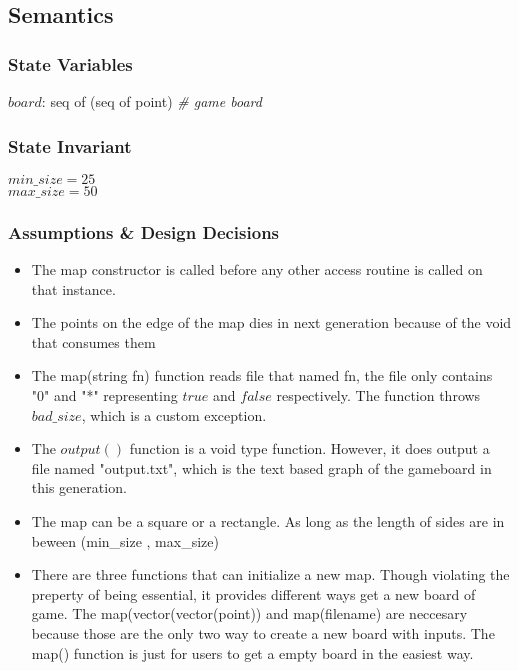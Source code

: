 \documentclass[12pt]{article}
\begin{document}
\subsection* {Semantics}

\subsubsection* {State Variables}

$board$: seq of (seq of point) \textit{\# game board}\\

\subsubsection* {State Invariant}

$min\_size = 25$\\
$max\_size = 50$\\

\subsubsection* {Assumptions \& Design Decisions}

\begin{itemize}

\item The map constructor is called before any other access
  routine is called on that instance. 

\item The points on the edge of the map dies in next generation because of
	the void that consumes them

\item The map(string fn) function reads file that named fn, the file only contains "0" and "*" representing $true$ and $false$ respectively.
	The function throws $bad\_size$, which is a custom exception.

\item The $output()$ function is a void type function. However, it does output a file named "output.txt", which is the text based 
	graph of the gameboard in this generation. 

\item The map can be a square or a rectangle. As long as the length of sides are in beween (min\_size , max\_size)

\item There are three functions that can initialize a new map. Though violating the preperty of being 
	essential, it provides different ways get a new board of game. The map(vector(vector(point)) and map(filename) are neccesary because
	those are the only two way to create a new board with inputs. The map() function is just for users to get a empty board in the easiest way. 



\end{itemize}
\end{document}
